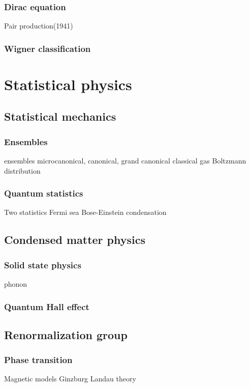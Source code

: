 \documentclass{../note}
\begin{document}
\section{}
\section{Dirac equation}
Pair production(1941)
\section{Wigner classification}






\part{Statistical physics}

\chapter{Statistical mechanics}
\section{Ensembles}
ensembles
microcanonical, canonical, grand canonical
classical gas
Boltzmann distribution
\section{Quantum statistics}
Two statistics
Fermi sea
Bose-Einstein condensation


\chapter{Condensed matter physics}
\section{Solid state physics}
phonon
\section{Quantum Hall effect}


\chapter{Renormalization group}
\section{Phase transition}
Magnetic models
Ginzburg Landau theory
\end{document}
